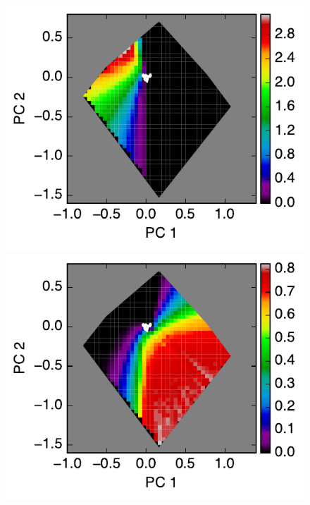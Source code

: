 \documentclass[iop,numberedappendix,apj,]{emulateapj}
\begin{document}
\begin{figure}[tbh!]
   \begin{minipage}{0.33\hsize}
    \begin{center}
	\includegraphics[width=\hsize]{raddata_2_norm_noreg_0.pdf}
    \end{center}	
   \end{minipage}
   \begin{minipage}{0.33\hsize}
    \begin{center}
	\includegraphics[width=\hsize]{raddata_2_norm_noreg_1.pdf}

\end{center}
\end{minipage}
\end{figure}
\end{document}
